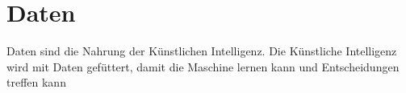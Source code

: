 \section{Daten}
\label{sec:data}

Daten sind die Nahrung der Künstlichen Intelligenz. Die Künstliche Intelligenz wird mit Daten
gefüttert, damit die Maschine lernen kann und Entscheidungen treffen kann